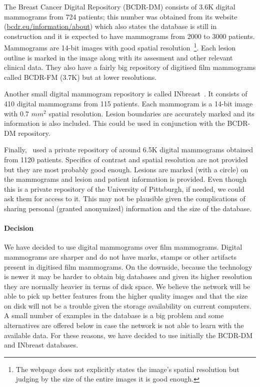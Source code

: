 \documentclass[11pt]{article}
\begin{document}
	The Breast Cancer Digital Repository (BCDR-DM) consists of 3.6K digital mammograms from 724 patients; this number was obtained from its website (\url{bcdr.eu/information/about}) which also states the database is still in construction and it is expected to have mammograms from 2000 to 3000 patients. Mammograms are 14-bit images with good spatial resolution~\footnote{The webpage does not explicitly states the image's spatial resolution but judging by the size of the entire images it is good enough.}. Each lesion outline is marked in the image along with its assesment and other relevant clinical data. They also have a fairly big repository of digitised film mammograms called BCDR-FM (3.7K) but at lower resolutions.

	Another small digital mammogram repository is called INbreast~\cite{Moreira2012}. It consists of 410 digital mammograms from 115 patients. Each mammogram is a 14-bit image with 0.7 $mm^2$ spatial resolution. Lesion boundaries are accurately marked and its information is also included. This could be used in conjunction with the BCDR-DM repository.

	Finally,~\cite{Zheng2012} used a private repository of around 6.5K digital mammograms obtained from 1120 patients. Specifics of contrast and spatial resolution are not provided but they are most probably good enough. Lesions are marked (with a circle) on the mammograms and lesion and patient information is provided. Even though this is a private repository of the University of Pittsburgh, if needed, we could ask them for access to it. This may not be plausible given the complications of sharing personal (granted anonymized) information and the size of the database.


\paragraph{Decision}
We have decided to use digital mammograms over film mammograms. Digital mammograms are sharper and do not have marks, stamps or other artifacts present in digitised film mammograms. On the downside, because the technology is newer it may be harder to obtain big databases and given its higher resolution they are normally heavier in terms of disk space. We believe the network will be able to pick up better features from the higher quality images and that the size on disk will not be a trouble given the storage availability on current computers. A small number of examples in the database is a big problem and some alternatives are offered below in case the network is not able to learn with the available data. For these reasons, we have decided to use initially the BCDR-DM and INbreast databases.
\end{document}
